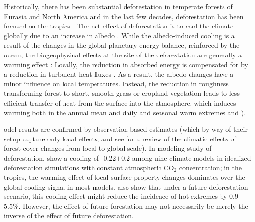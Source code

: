 \documentclass[draft]{agujournal2019}
\begin{document}
Historically, there has been substantial deforestation in temperate forests of Eurasia and North America and in the last few decades, deforestation has been focused on the tropics \cite{goldewijk_estimating_2001}.
The net effect of deforestation is to cool the climate globally due to an increase in albedo \cite{davin_climatic_2010}.
While the albedo-induced cooling is a result of the changes in the global planetary energy balance, reinforced by the ocean, the biogeophysical effects at the site of the deforestation are generally a warming effect \cite{winckler_nonlocal_2019,kumar_land_2013,li_potential_2016,betts_biogeophysical_2001,lee_observed_2011}: Locally, the reduction in absorbed energy is compensated for by a reduction in turbulent heat fluxes \cite{winckler_importance_2019}.
As a result, the albedo changes have a minor influence on local temperatures.
Instead, the reduction in roughness transforming forest to short, smooth grass or cropland vegetation leads to less efficient transfer of heat from the surface into the atmosphere, which induces warming both in the annual mean and daily and seasonal warm extremes \cite{winckler_different_2019}
  and ).

odel results are confirmed by observation-based estimates (which by way of their setup capture only local effects;  and see  for a review of the climatic effects of forest cover changes from local to global scale).
In  modeling study of deforestation,  show a cooling of -0.22$\pm$0.2 \textcelsius{} among nine climate models in idealized deforestation simulations with constant atmospheric CO$_2$ concentration; in the tropics, the warming effect of local surface property changes dominates over the global cooling signal in most models.
 also show that under a future deforestation scenario, this cooling effect might reduce the incidence of hot extremes by 0.9--5.5\%.
However, the effect of future forestation may not necessarily be merely the inverse of the effect of future deforestation.
\end{document}
